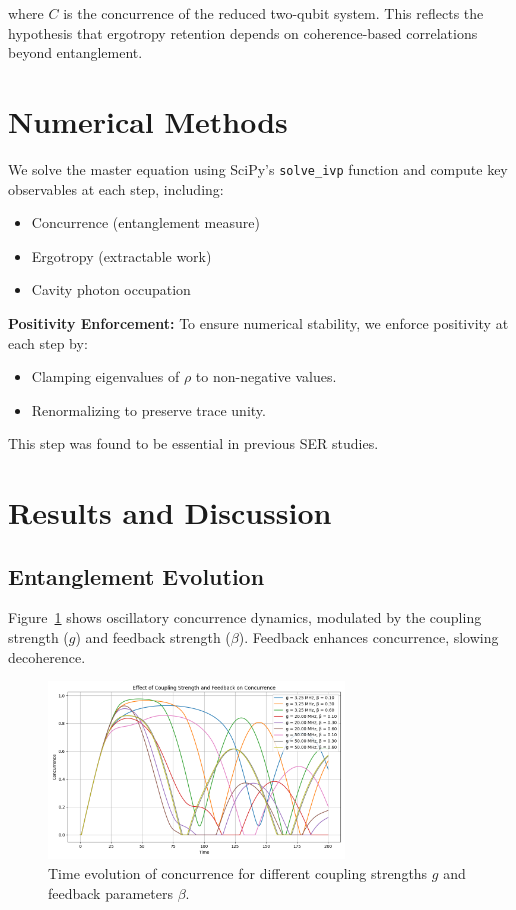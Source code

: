 \documentclass[12pt]{article}
\begin{document}
where $C$ is the concurrence of the reduced two-qubit system. This reflects the hypothesis that ergotropy retention depends on coherence-based correlations beyond entanglement.

\section{Numerical Methods}

We solve the master equation using SciPy’s \texttt{solve\_ivp} function and compute key observables at each step, including:
\begin{itemize}
    \item Concurrence (entanglement measure)
    \item Ergotropy (extractable work)
    \item Cavity photon occupation
\end{itemize}

\textbf{Positivity Enforcement:}
To ensure numerical stability, we enforce positivity at each step by:
\begin{itemize}
    \item Clamping eigenvalues of $\rho$ to non-negative values.
    \item Renormalizing to preserve trace unity.
\end{itemize}

This step was found to be essential in previous SER studies.

\section{Results and Discussion}

\subsection{Entanglement Evolution}
Figure~\ref{fig:concurrence} shows oscillatory concurrence dynamics, modulated by the coupling strength ($g$) and feedback strength ($\beta$). Feedback enhances concurrence, slowing decoherence.

\begin{figure}[h]
    \centering
    \includegraphics[width=0.7\textwidth]{Figure1.png}
    \caption{Time evolution of concurrence for different coupling strengths $g$ and feedback parameters $\beta$.}
    \label{fig:concurrence}
\end{figure}
\end{document}
